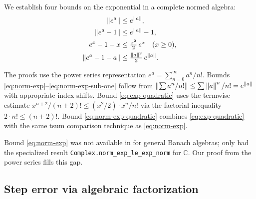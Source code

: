 We establish four bounds on the exponential in a complete normed algebra:
\begin{align}
  \left\|e^a\right\| &\le e^{\left\|a\right\|},
    \label{eq:norm-exp} \\
  \left\|e^a - 1\right\| &\le e^{\left\|a\right\|} - 1,
    \label{eq:norm-exp-sub-one} \\
  e^x - 1 - x &\le \tfrac{x^2}{2}\,e^x
    \quad (x \ge 0),
    \label{eq:exp-quadratic} \\
  \left\|e^a - 1 - a\right\| &\le \tfrac{\left\|a\right\|^2}{2}\,e^{\left\|a\right\|}.
    \label{eq:norm-exp-quadratic}
\end{align}

The proofs use the power series representation $e^a = \sum_{n=0}^{\infty} a^n/n!$.
Bounds \eqref{eq:norm-exp}--\eqref{eq:norm-exp-sub-one} follow from
$\left\|\sum a^n/n!\right\| \le \sum \left\|a\right\|^n/n! = e^{\left\|a\right\|}$ with appropriate
index shifts. Bound \eqref{eq:exp-quadratic} uses the termwise estimate
$x^{n+2}/(n+2)! \le (x^2/2) \cdot x^n/n!$ via the factorial inequality
$2 \cdot n! \le (n+2)!$. Bound \eqref{eq:norm-exp-quadratic} combines
\eqref{eq:exp-quadratic} with the same tsum comparison technique as
\eqref{eq:norm-exp}.

\begin{remark}
  Bound \eqref{eq:norm-exp} was not available in \Mathlib for general
  Banach algebras; \Mathlib only had the specialized result
  \texttt{Complex.norm\_exp\_le\_exp\_norm} for $\mathbb{C}$.
  Our proof from the power series fills this gap.
\end{remark}

\subsection{Step error via algebraic factorization}
\label{sec:step-error}

